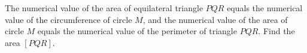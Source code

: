 The numerical value of the area of equilateral triangle $PQR$ equals the numerical value of the circumference of circle $M$, and the numerical value of the area of circle $M$ equals the numerical value of the perimeter of triangle $PQR$. Find the area $[PQR]$.
